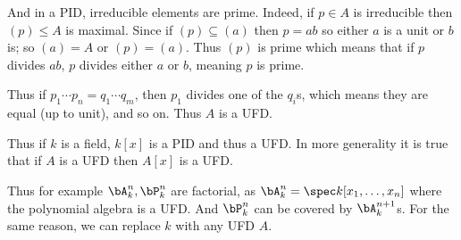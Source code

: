     And in a PID, irreducible elements are prime.
    Indeed, if $p\in A$ is irreducible then $(p)\leq A$ is maximal.
    Since if $(p)\subseteq(a)$ then $p=ab$ so either $a$ is a unit or $b$ is; so $(a)=A$ or $(p)=(a)$.
    Thus $(p)$ is prime which means that if $p$ divides $ab$, $p$ divides either $a$ or $b$, meaning $p$ is prime.

    Thus if $p_1\cdots p_n=q_1\cdots q_m$, then $p_1$ divides one of the $q_i$s, which means they are equal (up to unit), and so on.
    Thus $A$ is a UFD.

    Thus if $k$ is a field, $k[x]$ is a PID and thus a UFD.
    In more generality it is true that if $A$ is a UFD then $A[x]$ is a UFD.

\eremark

Thus for example $\bA^n_k,\bP^n_k$ are factorial, as $\bA^n_k=\spec k[x_1,\dots,x_n]$ where the polynomial algebra is a UFD.
And $\bP^n_k$ can be covered by $\bA^{n+1}_k$s.
For the same reason, we can replace $k$ with any UFD $A$.

